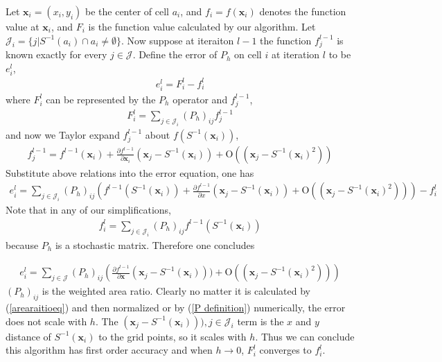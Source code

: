 Let $\mathbf{x}_i = (x_i,y_i)$ be the center of cell $a_i$, and $f_i
= f(\mathbf{x}_i)$ denotes the function value at $\mathbf{x}_i$, and
$F_i$ is the function value calculated by our algorithm. Let
$\mathcal{J}_i = \{j | S^{-1}(a_i) \cap a_i \neq \emptyset\}$. Now
suppose at iteraiton $l-1$ the function $f_j^{l-1}$ is known exactly
for every $j \in \mathcal{J}$. Define the error of $P_h$ on cell $i$
at iteration $l$ to be $e_i^l$,
\begin{eqnarray}
e_i^l = F_i^l - f_i^l
\end{eqnarray}
where $F_i^l$ can be represented by the $P_h$ operator and $f_j^{l-1}$,
\begin{eqnarray}
F_i^l = \sum_{j \in \mathcal{J}_i} (P_h)_{ij} f_j^{l-1}
\end{eqnarray}
and now we Taylor expand $f_j^{l-1}$ about $f(S^{-1}(\mathbf{x}_i))$,
\begin{eqnarray}
f_j^{l-1}  = f^{l-1}(\mathbf{x}_i) +
\frac{\partial{f^{l-1}}}{\partial{\mathbf{x}_i}}
(\mathbf{x}_j-S^{-1}(\mathbf{x}_i))
           + \text{O}((\mathbf{x}_j-S^{-1}(\mathbf{x}_i)^2))
\end{eqnarray}
Substitute above relations into the error equation, one has
\begin{eqnarray}
e_i^l = \sum_{j \in\mathcal{J}_i} (P_h)_{ij}
\left(f^{l-1}(S^{-1}(\mathbf{x}_i))
        + \frac{\partial{f^{l-1}}}{\partial{x}} (\mathbf{x}_j-S^{-1}(\mathbf{x}_i))
        + \text{O}((\mathbf{x}_j-S^{-1}(\mathbf{x}_i)^2))\right) - f_i^l
\end{eqnarray}
Note that in any of our simplifications,
\begin{eqnarray}
f_i^l = \sum_{j \in \mathcal{J}_i} (P_h)_{ij}
f^{l-1}(S^{-1}(\mathbf{x}_i))
\end{eqnarray}
because $P_h$ is a stochastic matrix. Therefore one concludes

\begin{eqnarray}
e_i^l = \sum_{j \in \mathcal{J}} (P_h)_{ij} \left(
\frac{\partial{f^{l-1}}}{\partial{\mathbf{x}}}
(\mathbf{x}_j-S^{-1}(\mathbf{x}_i))) + \text{O}((\mathbf{x}_j-S^{-1}(\mathbf{x}_i)^2))\right)
\end{eqnarray}
$(P_h)_{ij}$ is the weighted area ratio. Clearly no matter it is
calculated by (\ref{arearaitioeq}) and then normalized or by (\ref{P
definition}) numerically, the error does not scale with $h$. The
$(\mathbf{x}_j-S^{-1}(\mathbf{x}_i))),{j \in \mathcal{J}_i}$ term is
the $x$ and $y$ distance of $S^{-1}(\mathbf{x}_i)$ to the grid
points, so it scales with $h$. Thus we can conclude this algorithm
has first order accuracy and when $h \rightarrow 0$, $F_i^l$
converges to $f_i^l$.

